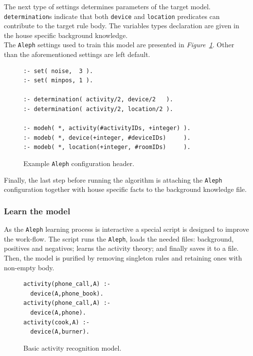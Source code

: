 \documentclass[10pt, a4paper, pdflatex, leqno, twoside, openright]{report}
\begin{document}
The next type of settings determines parameters of the target model. \texttt{determination}s indicate that both \texttt{device} and \texttt{location} predicates can contribute to the target rule body. The variables types declaration are given in the house specific background knowledge.\\
The \texttt{Aleph} settings used to train this model are presented in \emph{Figure~\ref{lst:alephConfHead}}. Other than the aforementioned settings are left default.\\

\begin{figure}[htb]
  \begin{verbatim}
:- set( noise,  3 ).
:- set( minpos, 1 ).

:- determination( activity/2, device/2   ).
:- determination( activity/2, location/2 ).

:- modeh( *, activity(#activityIDs, +integer) ).
:- modeb( *, device(+integer, #deviceIDs)     ).
:- modeb( *, location(+integer, #roomIDs)     ).
  \end{verbatim}
  \caption{Example \texttt{Aleph} configuration header.\label{lst:alephConfHead}}
\end{figure}

Finally, the last step before running the algorithm is attaching the \texttt{Aleph} configuration together with house specific facts to the background knowledge file.

      \subsubsection{Learn the model}
As the \texttt{Aleph} learning process is interactive a special script is designed to improve the work-flow. The script runs the \texttt{Aleph}, loads the needed files: background, positives and negatives; learns the activity theory; and finally saves it to a file.\\
Then, the model is purified by removing singleton rules and retaining ones with non-empty body.\\

\begin{figure}[htb]
  \begin{verbatim}
activity(phone_call,A) :-
  device(A,phone_book).
activity(phone_call,A) :-
  device(A,phone).
activity(cook,A) :-
  device(A,burner).
  \end{verbatim}
  \caption{Basic activity recognition model.\label{lst:alephBasicModel}}
\end{figure}
\end{document}
